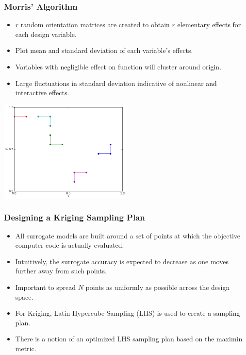 \begin{frame}
\frametitle{Morris' Algorithm}

\begin{itemize}
  \item $r$ random orientation matrices are created to obtain $r$ elementary effects for each design variable. 
  \item Plot mean and standard deviation of each variable's effects.
  \item Variables with negligible effect on function will cluster around origin. 
  \item Large fluctuations in standard deviation indicative of nonlinear and interactive effects.              
\end{itemize}

\centering
\includegraphics[width=0.50\textwidth]{./morris_alg.png}

\end{frame}
\begin{frame}
\frametitle{Designing a Kriging Sampling Plan}

\begin{itemize}
  \item All surrogate models are built around a set of points at which the objective computer code is actually evaluated. 
  \item Intuitively, the surrogate accuracy is expected to decrease as one moves further away from such points. 
  \item Important to spread $N$ points as uniformly as possible across the design space.
  \item For Kriging, Latin Hypercube Sampling (LHS) is used to create a sampling plan.
  \item There is a notion of an optimized LHS sampling plan based on the maximin metric.   
\end{itemize}

\end{frame}

